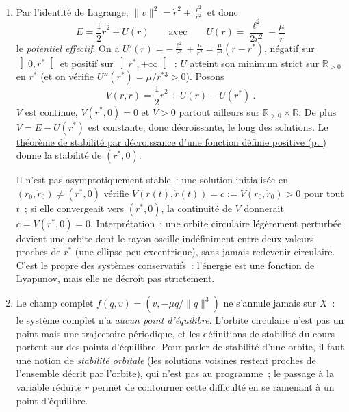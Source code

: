 \begin{enumerate}
\[  \] en utilisant \(\ell^2 = \mu r^*\). Ses valeurs propres sont
  \(\pm i\sqrt{\mu/r^{*3}}\), imaginaires pures~: le
  \protect\hyperlink{theo_linTangent}{théorème du linéarisé tangent (p.
  \pageref*{theo_linTangent})} ne permet pas de conclure. (On
  reconnaît dans \(\omega = \sqrt{\mu/r^{*3}}\) la vitesse angulaire de
  l'orbite circulaire, c'est la troisième loi de Kepler~: une petite
  perturbation du rayon oscille à la fréquence orbitale.)
\item
  Par l'identité de Lagrange, \(\|v\|^2 = \dot r^2 + \frac{\ell^2}{r^2}\)
  et donc \[
  E = \frac{1}{2}\dot r^2 + U(r) \qquad \text{avec} \qquad U(r) = \frac{\ell^2}{2r^2} - \frac{\mu}{r}
  \] le \emph{potentiel effectif}. On a
  \(U'(r) = -\frac{\ell^2}{r^3}+\frac{\mu}{r^2} = \frac{\mu}{r^3}(r - r^*)\),
  négatif sur \(\left]0,r^*\right[\) et positif sur
  \(\left]r^*,+\infty\right[\)~: \(U\) atteint son minimum strict sur
  \(\mathbb{R}_{>0}\) en \(r^*\) (et on vérifie
  \(U''(r^*) = \mu/r^{*3}>0\)). Posons \[
  V(r,\dot r) = \frac{1}{2}\dot r^2 + U(r) - U(r^*) \ .
  \] \(V\) est continue, \(V(r^*,0) = 0\) et \(V>0\) partout ailleurs
  sur \(\mathbb{R}_{>0}\times\mathbb{R}\). De plus \(V = E - U(r^*)\)
  est constante, donc décroissante, le long des solutions. Le
  \protect\hyperlink{stab_decroissance}{théorème de stabilité par
  décroissance d'une fonction définie positive (p.
  \pageref*{stab_decroissance})} donne la stabilité de \((r^*,0)\).

  Il n'est pas asymptotiquement stable~: une solution initialisée en
  \((r_0,\dot r_0)\neq(r^*,0)\) vérifie \(V(r(t),\dot r(t)) = c :=
  V(r_0,\dot r_0)>0\) pour tout \(t\)~; si elle convergeait vers
  \((r^*,0)\), la continuité de \(V\) donnerait \(c = V(r^*,0) = 0\).
  Interprétation~: une orbite circulaire légèrement perturbée devient
  une orbite dont le rayon oscille indéfiniment entre deux valeurs
  proches de \(r^*\) (une ellipse peu excentrique), sans jamais
  redevenir circulaire. C'est le propre des systèmes conservatifs~:
  l'énergie est une fonction de Lyapunov, mais elle ne décroît pas
  strictement.
\item
  Le champ complet \(f(q,v) = (v,-\mu q/\|q\|^3)\) ne s'annule jamais
  sur \(X\)~: le système complet n'a \emph{aucun point d'équilibre}.
  L'orbite circulaire n'est pas un point mais une trajectoire
  périodique, et les définitions de stabilité du cours portent sur des
  points d'équilibre. Pour parler de stabilité d'une orbite, il faut
  une notion de \emph{stabilité orbitale} (les solutions voisines
  restent proches de l'ensemble décrit par l'orbite), qui n'est pas au
  programme~; le passage à la variable réduite \(r\) permet de
  contourner cette difficulté en se ramenant à un point d'équilibre.
\end{enumerate}
